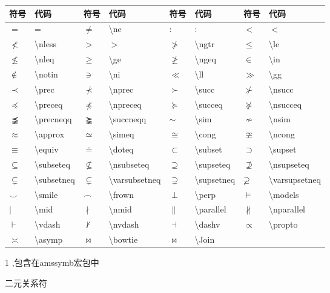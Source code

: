 \documentclass[UTF8,fontset=ubuntu]{ctexart}
\begin{document}
\begin{threeparttable}
\begin{tabular}{l l l l l l l l}
		\hline
		符号 & 代码 & 符号 & 代码 & 符号 & 代码 & 符号 & 代码\\\hline
		$=$ & = & $\ne$ & \textbackslash ne & $:$ & : & $<$ & $<$\\
		$\nless$ & \textbackslash nless\tnote{1} & $>$ & $>$ & $\ngtr$ & \textbackslash ngtr\tnote{1} & $\le$ & \textbackslash le\\
		$\nleq$ & \textbackslash nleq\tnote{1} & $\ge$ & \textbackslash ge & $\ngeq$ & \textbackslash ngeq\tnote{1} & $\in$ & \textbackslash in\\
		$\notin$ & \textbackslash notin & $\ni$ & \textbackslash ni & $\ll$ & \textbackslash ll & $\gg$ & \textbackslash gg\\
		$\prec$ & \textbackslash prec & $\nprec$ & \textbackslash nprec\tnote{1} & $\succ$ & \textbackslash succ & $\nsucc$ & \textbackslash nsucc\tnote{1}\\
		$\preceq$ & \textbackslash preceq & $\npreceq$ & \textbackslash npreceq\tnote{1} & $\succeq$ & \textbackslash succeq & $\nsucceq$ & \textbackslash nsucceq\tnote{1}\\
		$\precneqq$ & \textbackslash precneqq\tnote{1} & $\succneqq$ & \textbackslash succneqq & $\sim$ & \textbackslash sim & $\nsim$ & \textbackslash nsim\tnote{1}\\
		$\approx$ & \textbackslash approx & $\simeq$ & \textbackslash simeq & $\cong$ & \textbackslash cong & $\ncong$ & \textbackslash ncong\tnote{1}\\
		$\equiv$ & \textbackslash equiv & $\doteq$ & \textbackslash doteq & $\subset$ & \textbackslash subset & $\supset$ & \textbackslash supset\\
		$\subseteq$ & \textbackslash subseteq & $\nsubseteq$ & \textbackslash nsubseteq\tnote{1} & $\supseteq$ & \textbackslash supseteq & $\nsupseteq$ & \textbackslash nsupseteq\tnote{1}\\
		$\subsetneq$ & \textbackslash subsetneq\tnote{1} & $\varsubsetneq$ & \textbackslash varsubsetneq\tnote{1} & $\supsetneq$ & \textbackslash supsetneq\tnote{1} & $\varsupsetneq$ & \textbackslash varsupsetneq\tnote{1}\\
		$\smile$ & \textbackslash smile& $\frown$ & \textbackslash frown & $\perp$ & \textbackslash perp & $\models$ & \textbackslash models\\
		$\mid$ & \textbackslash mid & $\nmid$ & \textbackslash nmid\tnote{1} & $\parallel$ & \textbackslash parallel & $\nparallel$ & \textbackslash nparallel\tnote{1}\\
		$\vdash$ & \textbackslash vdash & $\nvdash$ & \textbackslash nvdash\tnote{1} & $\dashv$ & \textbackslash dashv & $\propto$ & \textbackslash propto\\
		$\asymp$ & \textbackslash asymp & $\bowtie$ & \textbackslash bowtie & $\Join$ & \textbackslash Join\tnote{1}\\\hline
\end{tabular}
\begin{tablenotes}
	\item[1] ,包含在amssymb宏包中
\end{tablenotes}
\caption{二元关系符}
\end{threeparttable}
\end{document}
